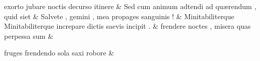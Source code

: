 \documentclass[12pt,onecolumn,twoside,a4paper]{memoir}
\begin{document}
\begin{pairs}
\begin{Leftside}
                              exorto
                              jubare
                              noctis
                              decurso
                              itinere \&
                         \stanza {}
                     Sed
                              cum
                              animum
                              adtendi
                              ad
                              quærendum
                              ,
                              quid
                              siet \&
                         \stanza {}
                     Salvete
                              ,
                              gemini
                              ,
                              mea
                              propages
                              sanguinis
                              ! \&
                         \stanza {}
                     Minitabiliterque
                              {Minitabiliterque}
                              increpare
                              dictis
                              saevis
                              incipit
                              . \&
                         \stanza {}
                     frendere
                              noctes
                              ,
                              misera
                              quas
                              perpessa
                              sum \&
                         \stanza {}
                     
                              fruges
                              frendendo
                              sola
                              saxi
                              robore \&
                     
                  \endnumbering
		\end{Leftside}
                  \begin{Rightside}
			\beginnumbering
			\numberstanzafalse
                     

\end{Rightside}
\end{pairs}
\end{document}
